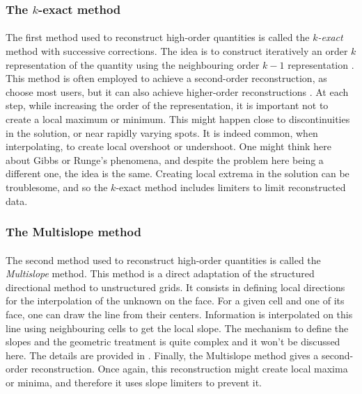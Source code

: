       \subsubsection{The $k$-exact method}

        \paragraph{}
        The first method used to reconstruct high-order quantities is called the \emph{$k$-exact} method with successive corrections.
        The idea is to construct iteratively an order $k$ representation of the quantity using the neighbouring order $k-1$ representation \cite{HaiderCroisilleCourbet2009}.
        This method is often employed to achieve a second-order reconstruction, as choose most users, but it can also achieve higher-order reconstructions \cite{HaiderCroisilleCourbet2011, HaiderCourbetCroisille2018, PontBrennerCinellaEtAl2017}.
        At each step, while increasing the order of the representation, it is important not to create a local maximum or minimum.
        This might happen close to discontinuities in the solution, or near rapidly varying spots.
        It is indeed common, when interpolating, to create local overshoot or undershoot.
        One might think here about Gibbs or Runge's phenomena, and despite the problem here being a different one, the idea is the same.
        Creating local extrema in the solution can be troublesome, and so the $k$-exact method includes limiters to limit reconstructed data.


      \subsubsection{The Multislope method}

        \paragraph{}
        The second method used to reconstruct high-order quantities is called the \emph{Multislope} method.
        This method is a direct adaptation of the structured directional method to unstructured grids.
        It consists in defining local directions for the interpolation of the unknown on the face.
        For a given cell and one of its face, one can draw the line from their centers.
        Information is interpolated on this line using neighbouring cells to get the local slope.
        The mechanism to define the slopes and the geometric treatment is quite complex and it won't be discussed here.
        The details are provided in \cite{LeTouzeMurroneGuillard2015}.
        Finally, the Multislope method gives a second-order reconstruction.
        Once again, this reconstruction might create local maxima or minima, and therefore it uses slope limiters \cite{Venkatakrishnan1993, BergerAftosmis2005} to prevent it.


